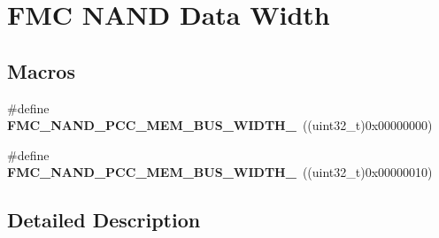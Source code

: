 \hypertarget{group___f_m_c___n_a_n_d___data___width}{}\section{F\+MC N\+A\+ND Data Width}
\label{group___f_m_c___n_a_n_d___data___width}
\subsection*{Macros}
\begin{DoxyCompactItemize}
\item 
\#define {\bfseries F\+M\+C\+\_\+\+N\+A\+N\+D\+\_\+\+P\+C\+C\+\_\+\+M\+E\+M\+\_\+\+B\+U\+S\+\_\+\+W\+I\+D\+T\+H\+\_}~((uint32\+\_\+t)0x00000000)\hypertarget{group___f_m_c___n_a_n_d___data___width_ga94a37072cafe5b41891c1521e83819ea}{}\label{group___f_m_c___n_a_n_d___data___width_ga94a37072cafe5b41891c1521e83819ea}

\item 
\#define {\bfseries F\+M\+C\+\_\+\+N\+A\+N\+D\+\_\+\+P\+C\+C\+\_\+\+M\+E\+M\+\_\+\+B\+U\+S\+\_\+\+W\+I\+D\+T\+H\+\_}~((uint32\+\_\+t)0x00000010)\hypertarget{group___f_m_c___n_a_n_d___data___width_ga0d7513e0e34ea8761d792c9dbd96215d}{}\label{group___f_m_c___n_a_n_d___data___width_ga0d7513e0e34ea8761d792c9dbd96215d}

\end{DoxyCompactItemize}


\subsection{Detailed Description}
